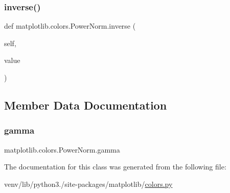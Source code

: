 \subsubsection{\texorpdfstring{inverse()}{inverse()}}
{\footnotesize\ttfamily def matplotlib.\+colors.\+Power\+Norm.\+inverse (\begin{DoxyParamCaption}\item[{}]{self,  }\item[{}]{value }\end{DoxyParamCaption})}



\subsection{Member Data Documentation}
\mbox{\label{classmatplotlib_1_1colors_1_1PowerNorm_abba7fb84d396af1f672b6cc82362fe05}} 
\subsubsection{\texorpdfstring{gamma}{gamma}}
{\footnotesize\ttfamily matplotlib.\+colors.\+Power\+Norm.\+gamma}



The documentation for this class was generated from the following file\+:\begin{DoxyCompactItemize}
\item 
venv/lib/python3./site-\/packages/matplotlib/\hyperlink{colors_8py}{colors.\+py}\end{DoxyCompactItemize}
